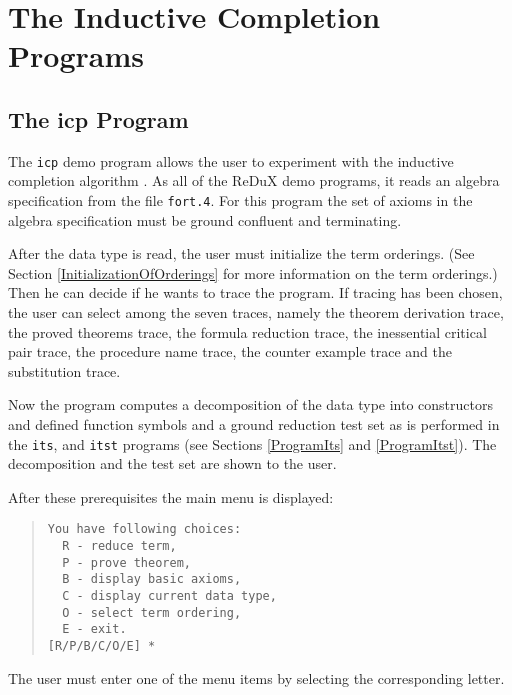 \section{The Inductive Completion Programs}
\subsection{The icp Program}
The {\tt icp} demo program allows the user to experiment with the
inductive completion algorithm \cite{Buendgen:87}.
As all of the ReDuX demo programs, it reads an algebra specification
from the file {\tt fort.4}. For this program the set of axioms in the 
algebra specification must be ground confluent and terminating.

After the data type is read, the user must initialize the term orderings.
(See Section \ref{InitializationOfOrderings} for more information on the
term orderings.)
Then he can decide if he wants to trace the program. If tracing has been
chosen,
the user can select among the seven traces, namely the 
theorem derivation trace, the proved theorems trace, the formula reduction 
trace, the inessential critical pair trace, the procedure name trace, 
the counter example trace and the substitution trace.

Now the program computes a decomposition of the data type into constructors 
and defined
function symbols and a ground reduction test set as is performed in the
{\tt its}, and {\tt itst} programs (see Sections \ref{ProgramIts} and 
\ref{ProgramItst}).
The decomposition and the test set are shown to the user.

After these prerequisites the main menu is displayed:
\begin{quote}
\begin{verbatim}
You have following choices: 
  R - reduce term,
  P - prove theorem,
  B - display basic axioms,
  C - display current data type,
  O - select term ordering,
  E - exit.
[R/P/B/C/O/E] *
\end{verbatim}
\end{quote}
The user must enter one of the menu items by selecting the corresponding
letter.

